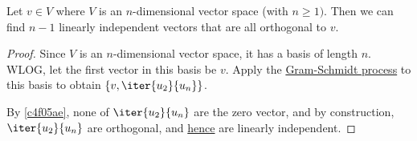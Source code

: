 \label{a0fa485}

Let $v\in V$ where $V$ is an $n$-dimensional vector space (with $n\geq1)$. Then
we can find $n-1$ linearly independent vectors that are all orthogonal to $v$.

\begin{proof}
  Since $V$ is an $n$-dimensional vector space, it has a basis of length $n$.
  WLOG, let the first vector in this basis be $v$. Apply the
  \href{b75ef8e}{Gram-Schmidt process} to this basis to obtain
  $\{v,\iter{u_2}{u_n}\}$.

  By \autoref{c4f05ae}, none of $\iter{u_2}{u_n}$ are the zero vector, and by
  construction, $\iter{u_2}{u_n}$ are orthogonal, and \href{c0eb6f5}{hence} are
  linearly independent.
\end{proof}
